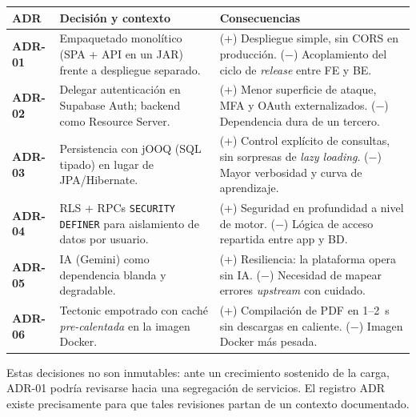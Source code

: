 \vspace{0.2cm}
\noindent
\renewcommand{\arraystretch}{1.3}
\fontsize{8.5}{10.2}\selectfont\sffamily
\begin{tabularx}{\textwidth}{|>{\bfseries\color{colorPrimario}}l|X|X|}
\hline
\rowcolor{headerTabla}
\textbf{ADR} & \textbf{Decisión y contexto} & \textbf{Consecuencias} \\
\hline
ADR-01 & Empaquetado monolítico (SPA + API en un JAR) frente a despliegue separado. & (+) Despliegue simple, sin CORS en producción. ($-$) Acoplamiento del ciclo de \textit{release} entre FE y BE. \\
\hline
\rowcolor{grisTecnico}
ADR-02 & Delegar autenticación en Supabase Auth; backend como Resource Server. & (+) Menor superficie de ataque, MFA y OAuth externalizados. ($-$) Dependencia dura de un tercero. \\
\hline
ADR-03 & Persistencia con jOOQ (SQL tipado) en lugar de JPA/Hibernate. & (+) Control explícito de consultas, sin sorpresas de \textit{lazy loading}. ($-$) Mayor verbosidad y curva de aprendizaje. \\
\hline
\rowcolor{grisTecnico}
ADR-04 & RLS + RPCs \texttt{SECURITY DEFINER} para aislamiento de datos por usuario. & (+) Seguridad en profundidad a nivel de motor. ($-$) Lógica de acceso repartida entre app y BD. \\
\hline
ADR-05 & IA (Gemini) como dependencia blanda y degradable. & (+) Resiliencia: la plataforma opera sin IA. ($-$) Necesidad de mapear errores \textit{upstream} con cuidado. \\
\hline
\rowcolor{grisTecnico}
ADR-06 & Tectonic empotrado con caché \textit{pre-calentada} en la imagen Docker. & (+) Compilación de PDF en 1--2~s sin descargas en caliente. ($-$) Imagen Docker más pesada. \\
\hline
\end{tabularx}

\begin{AvisoNota}
Estas decisiones no son inmutables: ante un crecimiento sostenido de la carga, ADR-01
podría revisarse hacia una segregación de servicios. El registro ADR existe
precisamente para que tales revisiones partan de un contexto documentado.
\end{AvisoNota}
